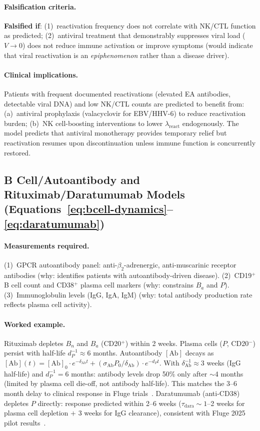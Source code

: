 \paragraph{Falsification criteria.}
\textbf{Falsified if}: (1)~reactivation frequency does not correlate with NK/CTL function as predicted; (2)~antiviral treatment that demonstrably suppresses viral load ($V \to 0$) does not reduce immune activation or improve symptoms (would indicate that viral reactivation is an \emph{epiphenomenon} rather than a disease driver).

\paragraph{Clinical implications.}
Patients with frequent documented reactivations (elevated EA antibodies, detectable viral DNA) and low NK/CTL counts are predicted to benefit from: (a)~antiviral prophylaxis (valacyclovir for EBV/HHV-6) to reduce reactivation burden; (b)~NK cell-boosting interventions to lower $\lambda_{\text{react}}$ endogenously. The model predicts that antiviral monotherapy provides temporary relief but reactivation resumes upon discontinuation unless immune function is concurrently restored.

\subsection{B Cell/Autoantibody and Rituximab/Daratumumab Models (Equations~\ref{eq:bcell-dynamics}--\ref{eq:daratumumab})}

\paragraph{Measurements required.}
(1)~GPCR autoantibody panel: anti-$\beta_2$-adrenergic, anti-muscarinic receptor antibodies (why: identifies patients with autoantibody-driven disease).
(2)~CD19$^+$ B cell count and CD38$^+$ plasma cell markers (why: constrains $B_a$ and $P$).
(3)~Immunoglobulin levels (IgG, IgA, IgM) (why: total antibody production rate reflects plasma cell activity).

\paragraph{Worked example.}
Rituximab depletes $B_n$ and $B_a$ (CD20$^+$) within 2 weeks. Plasma cells ($P$, CD20$^-$) persist with half-life $d_P^{-1} \approx 6$ months. Autoantibody $[\text{Ab}]$ decays as $[\text{Ab}](t) = [\text{Ab}]_0 \cdot e^{-\delta_{\text{Ab}} t} + (\sigma_{\text{Ab}} P_0 / \delta_{\text{Ab}}) \cdot e^{-d_P t}$. With $\delta_{\text{Ab}}^{-1} \approx 3$ weeks (IgG half-life) and $d_P^{-1} = 6$ months: antibody levels drop 50\% only after $\sim$4 months (limited by plasma cell die-off, not antibody half-life). This matches the 3--6 month delay to clinical response in Fluge trials~\cite{Fluge2011rituximab}. Daratumumab (anti-CD38) depletes $P$ directly: response predicted within 2--6 weeks ($\tau_{\text{dara}} \sim 1$--2 weeks for plasma cell depletion $+$ 3 weeks for IgG clearance), consistent with Fluge 2025 pilot results~\cite{Fluge2025daratumumab}.

